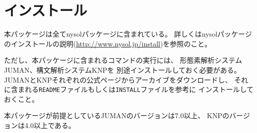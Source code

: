 
%

\section{インストール\label{sect:install}}

本パッケージは全てnysolパッケージに含まれている。 
詳しくはnysolパッケージのインストールの説明(\url{http://www.nysol.jp/install})を参照のこと。

ただし、本パッケージに含まれるコマンドの実行には、
形態素解析システムJUMAN、構文解析システムKNPを
別途インストールしておく必要がある。
JUMANとKNPそれぞれの公式ページからアーカイブをダウンロードし、
それに含まれる\verb|README|ファイルもしくは\verb|INSTALL|ファイルを参考に
インストールしておくこと。

本パッケージが前提としているJUMANのバージョンは7.0以上、
KNPのバージョンは4.0以上である。


